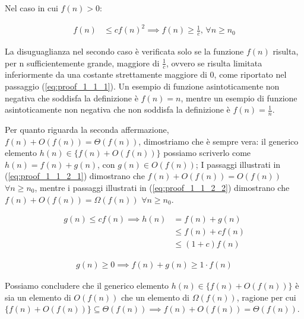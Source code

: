 \documentclass{article}
\begin{document}
\noindent
Nel caso in cui $f(n) > 0$:

\begin{equation} \label{eq:proof_1_1_1}
\begin{aligned}
f(n) &\le cf(n)^2 \implies f(n) \ge \frac{1}{c} \text{,  } \forall n \ge n_0
\end{aligned}
\end{equation}

\noindent
La disuguaglianza nel secondo caso è verificata solo se la funzione $f(n)$ risulta, per n sufficientemente grande, maggiore di $\frac{1}{c}$, ovvero se risulta limitata inferiormente da una costante strettamente maggiore di 0, come riportato nel passaggio (\ref{eq:proof_1_1_1}).
Un esempio di funzione asintoticamente non negativa che soddisfa la definizione è $f(n) = n$, mentre un esempio di funzione asintoticamente non negativa che non soddisfa la definizione è $f(n) = \frac{1}{n}$.
\vspace{\baselineskip}

\noindent
Per quanto riguarda la seconda affermazione, $f(n) + O(f(n)) =  \Theta(f(n))$, dimostriamo che è sempre vera: il generico elemento $h(n) \in \{f(n) + O(f(n))\}$ possiamo scriverlo come $h(n) = f(n) + g(n)$, con $g(n) \in O(f(n))$; I passaggi illustrati in  (\ref{eq:proof_1_1_2_1}) dimostrano che $f(n) + O(f(n)) = O(f(n))$ $\forall n \ge n_0$, mentre i passaggi illustrati in (\ref{eq:proof_1_1_2_2}) dimostrano che $f(n) + O(f(n)) = \Omega(f(n))$ $\forall n \ge n_0$. 

\begin{equation} \label{eq:proof_1_1_2_1}
\begin{aligned}
g(n) \le cf(n) \implies h(n) &= f(n) + g(n) \\ &\le f(n) + cf(n) \\ 
&\le (1+c)f(n) 
\end{aligned}
\end{equation}

\begin{equation} \label{eq:proof_1_1_2_2}
\begin{aligned}
g(n) \ge 0 \implies f(n) + g(n) \ge 1 \cdot f(n)
\end{aligned}
\end{equation}

\noindent
Possiamo concludere che il generico elemento $h(n) \in \{f(n)+O(f(n))\}$ è sia un elemento di $O(f(n))$ che un elemento di $\Omega(f(n))$, ragione per cui $\{f(n)+O(f(n))\} \subseteq {\Theta(f(n))} \implies f(n) + O(f(n)) = \Theta(f(n))$.
\end{document}
